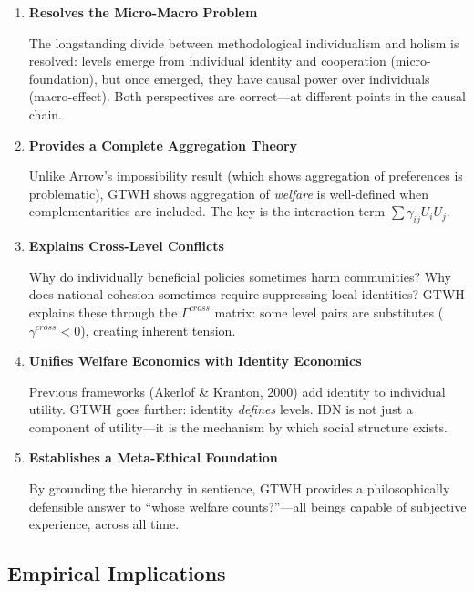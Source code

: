 \begin{enumerate}
\item \textbf{Resolves the Micro-Macro Problem}

The longstanding divide between methodological individualism and holism is 
resolved: levels emerge from individual identity and cooperation (micro-foundation), 
but once emerged, they have causal power over individuals (macro-effect). 
Both perspectives are correct---at different points in the causal chain.

\item \textbf{Provides a Complete Aggregation Theory}

Unlike Arrow's impossibility result (which shows aggregation of preferences 
is problematic), GTWH shows aggregation of \textit{welfare} is well-defined 
when complementarities are included. The key is the interaction term 
$\sum \gamma_{ij} U_i U_j$.

\item \textbf{Explains Cross-Level Conflicts}

Why do individually beneficial policies sometimes harm communities? 
Why does national cohesion sometimes require suppressing local identities? 
GTWH explains these through the $\Gamma^{cross}$ matrix: some level pairs 
are substitutes ($\gamma^{cross} < 0$), creating inherent tension.

\item \textbf{Unifies Welfare Economics with Identity Economics}

Previous frameworks (Akerlof \& Kranton, 2000) add identity to individual 
utility. GTWH goes further: identity \textit{defines} levels. IDN is not 
just a component of utility---it is the mechanism by which social structure exists.

\item \textbf{Establishes a Meta-Ethical Foundation}

By grounding the hierarchy in sentience, GTWH provides a philosophically 
defensible answer to ``whose welfare counts?''---all beings capable of 
subjective experience, across all time.

\end{enumerate}

\subsection{Empirical Implications}

